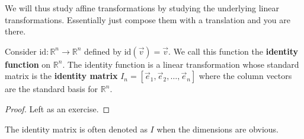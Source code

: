 \begin{remark}
We will thus study affine transformations by studying the underlying linear transformations. Essentially just compose them with a translation and you are there.
\end{remark}

\begin{proposition}
Consider $\text{id}:\mathbb{R}^n \to \mathbb{R}^n$ defined by $\text{id}(\vec{v})=\vec{v}$. We call this function the \textbf{identity function} on $\mathbb{R}^n$. The identity function is a linear transformation whose standard matrix is the \textbf{identity matrix} $I_n=[\vec{e}_1, \vec{e}_2, \ldots, \vec{e}_n]$ where the column vectors are the standard basis for $\mathbb{R}^n$.
\end{proposition}
\begin{proof}
Left as an exercise.
\end{proof}

\begin{remark}The identity matrix is often denoted as $I$ when the dimensions are obvious.
\end{remark}

